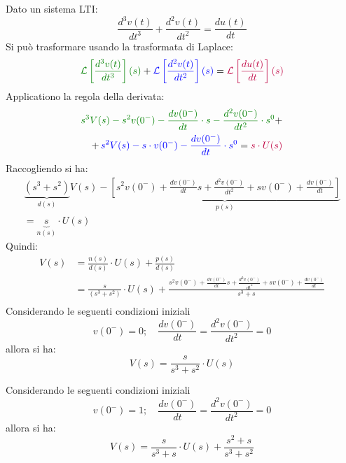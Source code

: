\documentclass[a4paper]{article}
\begin{document}
\begin{example}
  Dato un sistema LTI:
  \[
    \frac{d^3 v(t)}{dt^3} + \frac{d^2 v(t)}{dt^2} = \frac{d u(t)}{dt}
  \] 
  Si può trasformare usando la trasformata di Laplace:
  \[
    \color{green!50!black}\mathcal{L}\left[ \frac{d^3 v(t)}{dt^3} \right](s)\color{black}
    + \color{blue}\mathcal{L}\left[ \frac{d^2 v(t)}{dt^2} \right](s) \color{black} =
    \color{purple}\mathcal{L}\left[ \frac{d u(t)}{dt} \right](s)
  \] 
  Applicationo la regola della derivata:
  \[
    \begin{aligned}
      \color{green!50!black}s^3 V(s) - s^2 v(0^-) - \frac{dv(0^-)}{dt} \cdot s - \frac{d^2v(0^-)}{dt^2} \cdot s^0 \color{black}+\\
      +\, \color{blue}s^2 V(s) - s \cdot v(0^-) - \frac{dv(0^-)}{dt} \cdot s^0\color{black} = \color{purple}s \cdot U(s)
    \end{aligned}
  \] 
  Raccogliendo si ha:
  \[
    \begin{aligned}
      \underbrace{\left( s^3 + s^2 \right)}_{d(s)} V(s) - \underbrace{\left[ s^2 v(0^-) + \frac{dv(0^-)}{dt}s + \frac{d^2v(0^-)}{dt^2} +
      sv(0^-) + \frac{dv(0^-)}{dt} \right]}_{p(s)}\\ = \underbrace{s}_{n(s)} \cdot U(s)
    \end{aligned}
  \] 
  Quindi:
  \[
    \begin{aligned}
      V(s) &= \frac{n(s)}{d(s)} \cdot U(s) + \frac{p(s)}{d(s)}\\
           &= \frac{s}{(s^3+s^2)} \cdot U(s) + \frac{s^2 v(0^-) + \frac{dv(0^-)}{dt}s + \frac{d^2v(0^-)}{dt^2} +
           sv(0^-) + \frac{dv(0^-)}{dt}}{s^3+s}\\
    \end{aligned}
  \] 
  Considerando le seguenti condizioni iniziali
  \[
    v(0^-) = 0; \quad \frac{dv(0^-)}{dt} = \frac{d^2v(0^-)}{dt^2} = 0
  \] 
  allora si ha:
  \[
    V(s) = \frac{s}{s^3 + s^2} \cdot U(s)
  \] 

  \vspace{1em}
  \noindent
  Considerando le seguenti condizioni iniziali
  \[
    v(0^-) = 1; \quad \frac{dv(0^-)}{dt} = \frac{d^2v(0^-)}{dt^2} = 0
  \] 
  allora si ha:
  \[
    V(s) = \frac{s}{s^3 + s} \cdot U(s) + \frac{s^2 + s}{s^3 + s^2}
  \] 
\end{example}
\end{document}
